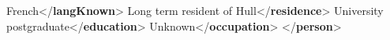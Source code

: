 \begin{shaded}
\hspace*{1em}French{</\textbf{langKnown}>}\mbox{}\newline 
{}\mbox{}\newline 
{}Long term resident of Hull{</\textbf{residence}>}\mbox{}\newline 
{}University postgraduate{</\textbf{education}>}\mbox{}\newline 
{}Unknown{</\textbf{occupation}>}\mbox{}\newline 
{}\mbox{}\newline 
{</\textbf{person}>}\end{shaded}\egroup\par \par
